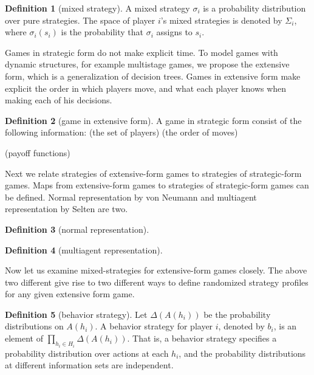 \documentclass{article}
\theoremstyle{definition}
\newtheorem{Def}{Definition}[section]
\begin{document}
\begin{Def}[mixed strategy]
    A mixed strategy $\sigma_i$ is a probability distribution over pure strategies.
    The space of player $i$'s mixed strategies is denoted by $\Sigma_i$, where $\sigma_i(s_i)$ is the probability that $\sigma_i$ assigns to $s_i$.
\end{Def}

Games in strategic form do not make explicit time. To model games with dynamic structures, for example multistage games, we propose the extensive form,
which is a generalization of decision trees.
Games in extensive form make explicit the order in which players move, and what each player knows when making each of his decisions.
\begin{Def}[game in extensive form]
    A game in strategic form consist of the following information:\newline 
    (the set of players)
    (the order of moves)

    (payoff functions)

\end{Def}


Next we relate strategies of extensive-form games to strategies of strategic-form games. Maps from
extensive-form games to strategies of strategic-form games can be defined. Normal representation by von Neumann and multiagent representation by Selten are two.\par 
\begin{Def}[normal representation]
    
\end{Def}

\begin{Def}[multiagent representation]
    
\end{Def}

Now let us examine mixed-strategies for extensive-form games closely. The above two different 
give rise to two different ways to define randomized strategy profiles for any given extensive form game.
\begin{Def}[behavior strategy]
    Let $\Delta(A(h_i))$ be the probability distributions on $A(h_i)$. A behavior strategy for player $i$, denoted by $b_i$,
    is an element of $\prod_{h_i\in H_i}\Delta(A(h_i))$. That is, a behavior strategy specifies a probability distribution over actions at each $h_i$,
    and the probability distributions at different information sets are independent.
\end{Def}
\end{document}
